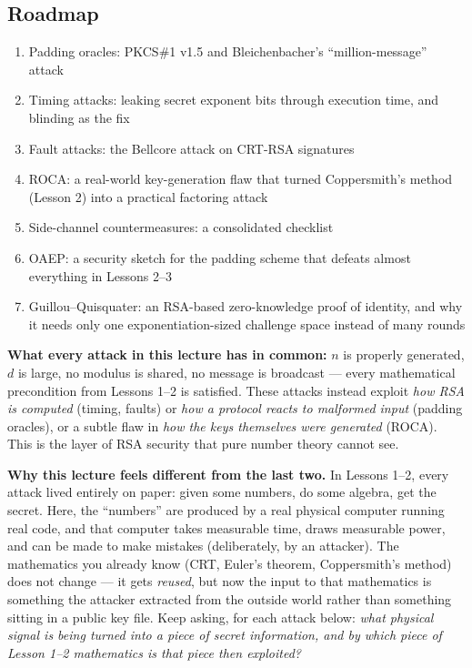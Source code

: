 \vspace{0.5cm}
\subsection*{Roadmap}
\begin{enumerate}[label=(\arabic*)]
\item Padding oracles: PKCS\#1 v1.5 and Bleichenbacher's ``million-message'' attack
\item Timing attacks: leaking secret exponent bits through execution time, and blinding as the fix
\item Fault attacks: the Bellcore attack on CRT-RSA signatures
\item ROCA: a real-world key-generation flaw that turned Coppersmith's method (Lesson 2) into a practical factoring attack
\item Side-channel countermeasures: a consolidated checklist
\item OAEP: a security sketch for the padding scheme that defeats almost everything in Lessons 2--3
\item Guillou--Quisquater: an RSA-based zero-knowledge proof of identity, and why it needs only one exponentiation-sized challenge space instead of many rounds
\end{enumerate}
\textbf{What every attack in this lecture has in common:} $n$ is properly generated, $d$ is large, no modulus is shared, no message is broadcast — every mathematical precondition from Lessons 1--2 is satisfied. These attacks instead exploit \emph{how RSA is computed} (timing, faults) or \emph{how a protocol reacts to malformed input} (padding oracles), or a subtle flaw in \emph{how the keys themselves were generated} (ROCA). This is the layer of RSA security that pure number theory cannot see.

\medskip\noindent\textbf{Why this lecture feels different from the last two.} In Lessons 1--2, every attack lived entirely on paper: given some numbers, do some algebra, get the secret. Here, the ``numbers'' are produced by a real physical computer running real code, and that computer takes measurable time, draws measurable power, and can be made to make mistakes (deliberately, by an attacker). The mathematics you already know (CRT, Euler's theorem, Coppersmith's method) does not change — it gets \emph{reused}, but now the input to that mathematics is something the attacker extracted from the outside world rather than something sitting in a public key file. Keep asking, for each attack below: \emph{what physical signal is being turned into a piece of secret information, and by which piece of Lesson 1--2 mathematics is that piece then exploited?}

